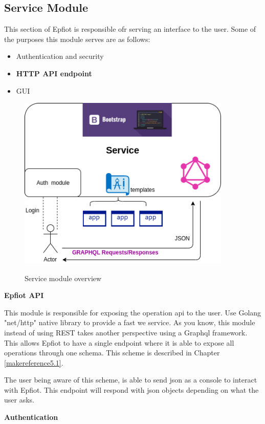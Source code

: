 \newpage
\subsection{Service Module}

This section of Epfiot is responsible ofr serving an interface to the user.
Some of the purposes this module serves are as follows:
\begin{itemize}
    \item Authentication and security
    \item \textbf{ HTTP API endpoint}
    \item GUI
\end{itemize}

\begin{figure}[h!]%
\centering
    \includegraphics[width=4.0in]{figures/Service.png}
~\caption{Service module overview}
\label{figure4.3}
\end{figure}

\textbf{Epfiot API}

This module is responsible for exposing the operation api to the user.
Use Golang "net/http" native library to provide a fast we service. As you know, this module instead of using REST takes another perspective using a Graphql framework. This allows Epfiot to have a single endpoint where it is able to expose all operations through one schema. This scheme is described in Chapter \ref{makereference5.1}.

The user being aware of this scheme, is able to send json as a console to interact with Epfiot. This endpoint will respond with json objects depending on what the user asks.
\newpage

\textbf{Authentication}

